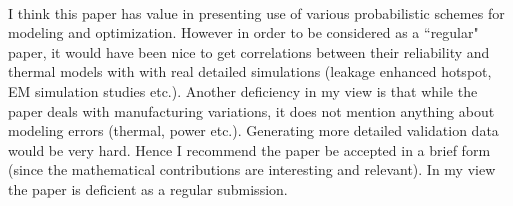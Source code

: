 \begin{reviewer}
\\
I think this paper has value in presenting use of various probabilistic schemes
for modeling and optimization. However in order to be considered as a
``regular" paper, it would have been nice to get correlations between their
reliability and thermal models with with real detailed simulations (leakage
enhanced hotspot, EM simulation studies etc.). Another deficiency in my view is
that while the paper deals with manufacturing variations, it does not mention
anything about modeling errors (thermal, power etc.). Generating more detailed
validation data would be very hard. Hence I recommend the paper be accepted in
a brief form (since the mathematical contributions are interesting and
relevant). In my view the paper is deficient as a regular submission.
\end{reviewer}

\begin{authors}
\begin{actions}
\end{actions}
\end{authors}
